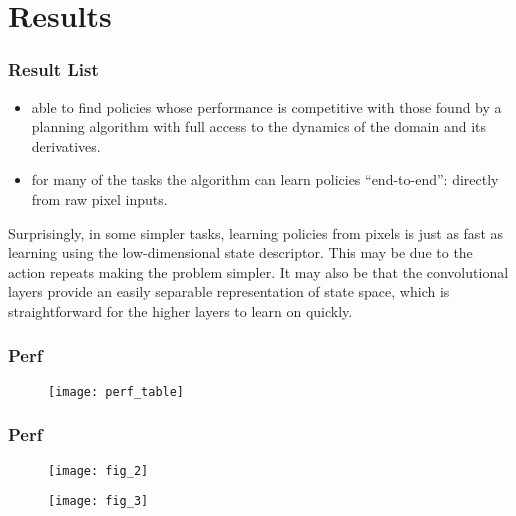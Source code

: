 \section{Results}

\begin{frame}
\frametitle{Result List}

\begin{itemize}
  \item able to find policies whose performance is competitive with those found by a planning algorithm with full access to the dynamics of the domain and its derivatives.
  \item for many of the tasks the algorithm can learn policies “end-to-end”: directly from raw pixel inputs.
\end{itemize}

Surprisingly, in some simpler tasks, learning policies from pixels is just as fast as learning using the low-dimensional state descriptor. This may be due to the action repeats making the problem simpler. It may also be that the convolutional layers provide an easily separable representation of state space, which is straightforward for the higher layers to learn on quickly.

\end{frame}

\begin{frame}
\frametitle{Perf}
\begin{figure}
    \centering
    \texttt{[image: perf\_table]}
\end{figure}
\end{frame}

\begin{frame}
\frametitle{Perf}
\begin{figure}
    \centering
    \texttt{[image: fig\_2]}
\end{figure}

\begin{figure}
    \centering
    \texttt{[image: fig\_3]}
\end{figure}

\end{frame}
